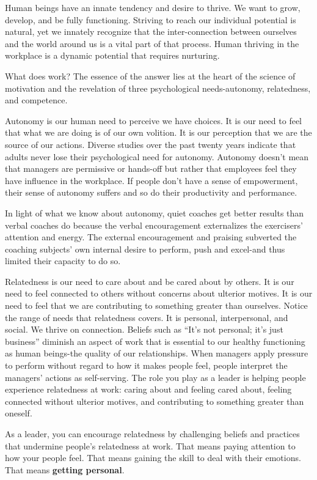\documentclass[ebook,12pt,oneside,openany]{memoir}
\begin{document}
Human beings have an innate tendency and desire to thrive. We want to grow, develop, and be fully functioning.
Striving to reach our individual potential is natural, yet we innately recognize that the inter-connection between ourselves and the world around us is a vital part of that process.
Human thriving in the workplace is a dynamic potential that requires nurturing. 

What does work? The essence of the answer lies at the heart of the science of motivation and the revelation of three psychological needs-autonomy, relatedness, and competence.

Autonomy is our human need to perceive we have choices. It is our need to feel that what we are doing is of our own volition. It is our perception that we are the source of our actions.
Diverse studies over the past twenty years indicate that adults never lose their psychological need for autonomy. 
Autonomy doesn't mean that managers are permissive or hands-off but rather that employees feel they have influence in the workplace.
If people don't have a sense of empowerment, their sense of autonomy suffers and so do their productivity and performance.

In light of what we know about autonomy, quiet coaches get better results than verbal coaches do because the verbal encouragement externalizes the exercisers' attention and energy.
The external encouragement and praising subverted the coaching subjects' own internal desire to perform, push and excel-and thus limited their capacity to do so.

Relatedness is our need to care about and be cared about by others. It is our need to feel connected to others without concerns about ulterior motives.
It is our need to feel that we are contributing to something greater than ourselves.
Notice the range of needs that relatedness covers. It is personal, interpersonal, and social. We thrive on connection.
Beliefs such as ``It's not personal; it's just business'' diminish an aspect of work that is essential to our healthy functioning as human beings-the quality of our relationships.
When managers apply pressure to perform without regard to how it makes people feel, people interpret the managers' actions as self-serving.
The role you play as a leader is helping people experience relatedness at work: caring about and feeling cared about, feeling connected without ulterior motives, and contributing to something greater than oneself.

As a leader, you can encourage relatedness by challenging beliefs and practices that undermine people's relatedness at work. That means paying attention to how your people feel.
That means gaining the skill to deal with their emotions. That means \textbf{getting personal}.
\end{document}
